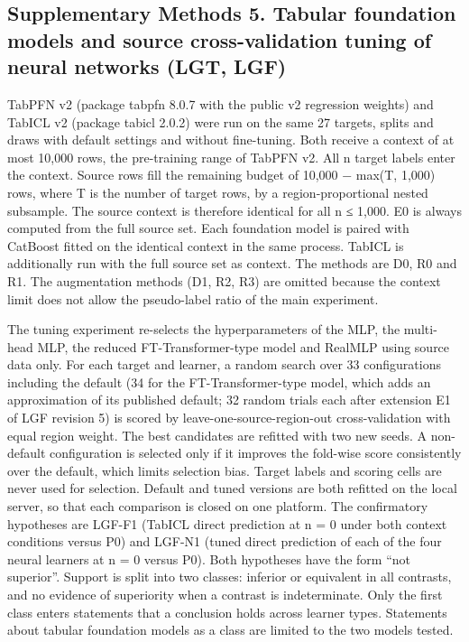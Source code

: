 \subsection*{Supplementary Methods 5. Tabular foundation models and source cross-validation tuning of neural networks (LGT, LGF)}

TabPFN v2\cite{Hollmann2025} (package tabpfn 8.0.7 with the public v2 regression weights) and TabICL v2\cite{Qu2026} (package tabicl 2.0.2) were run on the same 27 targets, splits and draws with default settings and without fine-tuning. Both receive a context of at most 10,000 rows, the pre-training range of TabPFN v2. All n target labels enter the context. Source rows fill the remaining budget of 10,000 − max(T, 1,000) rows, where T is the number of target rows, by a region-proportional nested subsample. The source context is therefore identical for all n ≤ 1,000. E0 is always computed from the full source set. Each foundation model is paired with CatBoost fitted on the identical context in the same process. TabICL is additionally run with the full source set as context. The methods are D0, R0 and R1. The augmentation methods (D1, R2, R3) are omitted because the context limit does not allow the pseudo-label ratio of the main experiment.

The tuning experiment re-selects the hyperparameters of the MLP, the multi-head MLP, the reduced FT-Transformer-type model and RealMLP using source data only. For each target and learner, a random search\cite{BergstraBengio2012} over 33 configurations including the default (34 for the FT-Transformer-type model, which adds an approximation of its published default; 32 random trials each after extension E1 of LGF revision 5) is scored by leave-one-source-region-out cross-validation with equal region weight. The best candidates are refitted with two new seeds. A non-default configuration is selected only if it improves the fold-wise score consistently over the default, which limits selection bias\cite{CawleyTalbot2010}. Target labels and scoring cells are never used for selection. Default and tuned versions are both refitted on the local server, so that each comparison is closed on one platform. The confirmatory hypotheses are LGF-F1 (TabICL direct prediction at n = 0 under both context conditions versus P0) and LGF-N1 (tuned direct prediction of each of the four neural learners at n = 0 versus P0). Both hypotheses have the form ``not superior''. Support is split into two classes: inferior or equivalent in all contrasts, and no evidence of superiority when a contrast is indeterminate. Only the first class enters statements that a conclusion holds across learner types. Statements about tabular foundation models as a class are limited to the two models tested.

